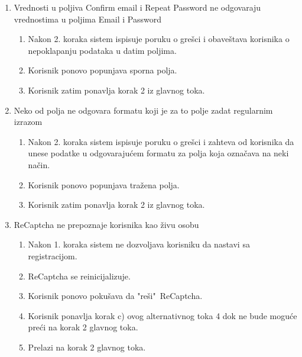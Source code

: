 \documentclass[a4paper]{article}
\begin{document}
\begin{itemize}
\begin{enumerate}
            \item Vrednosti u poljiva Confirm email i Repeat Password ne odgovaraju vrednostima u poljima Email i Password
                \begin{enumerate}
                    \item Nakon 2. koraka sistem ispisuje poruku o grešci i obaveštava korisnika o nepoklapanju podataka u datim poljima.
                    \item Korisnik ponovo popunjava sporna polja.
                    \item Korisnik zatim ponavlja korak 2 iz glavnog toka.
                \end{enumerate}
            \item Neko od polja ne odgovara formatu koji je za to polje zadat regularnim izrazom
                \begin{enumerate}
                    \item Nakon 2. koraka sistem ispisuje poruku o grešci i zahteva od korisnika da unese podatke u odgovarajućem formatu za polja koja označava na neki način.
                    \item Korisnik ponovo popunjava tražena polja.
                    \item Korisnik zatim ponavlja korak 2 iz glavnog toka.
                \end{enumerate}
            \item ReCaptcha ne prepoznaje korisnika kao živu osobu
                \begin{enumerate}
                    \item Nakon 1. koraka sistem ne dozvoljava korisniku da nastavi sa registracijom.
                    \item ReCaptcha se reinicijalizuje.
                    \item Korisnik ponovo pokušava da "reši"\ ReCaptcha.
                    \item Korisnik ponavlja korak c) ovog alternativnog toka 4 dok ne bude moguće preći na korak 2 glavnog toka.
                    \item Prelazi na korak 2 glavnog toka.
                \end{enumerate}
        \end{enumerate}
\end{itemize}
\end{document}
